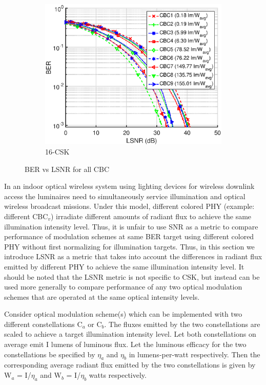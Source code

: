 \documentclass[10pt,letterpaper]{article}
\begin{document}
\begin{figure}[b]
		\vfill
		\begin{subfigure}{0.49\textwidth}
		\centering
			\includegraphics[trim={0.1in 0.0in 0.5in 0.1in}, clip=true, width=\textwidth]{M16_16-CSK_BERvsLSNR_NL.eps}
			\caption{16-CSK}
			\label{fig16LSNR}
		\end{subfigure}
	\caption{BER vs LSNR for all CBC}
	\label{figBERvsLSNR}
\end{figure}

In an indoor optical wireless system using lighting devices for wireless downlink access the luminaires need to simultaneously service illumination and optical wireless broadcast missions. Under this model, different colored PHY (example: different CBC$_{v}$) irradiate different amounts of radiant flux to achieve the same illumination intensity level. Thus, it is unfair to use SNR as a metric to compare performance of modulation schemes at same BER target using different colored PHY without first normalizing for illumination targets. Thus, in this section we introduce LSNR as a metric that takes into account the differences in radiant flux emitted by different PHY to achieve the same illumination intensity level. {\color{red}It should be noted that the LSNR metric is not specific to CSK, but instead can be used more generally to compare performance of any two optical modulation schemes that are operated at the same optical intensity levels.}

Consider optical modulation scheme(s) which can be implemented with two different constellations C$_a$ or C$_b$. The fluxes emitted by the two constellations are scaled to achieve a target illumination intensity level. Let both constellations on average emit I lumens of luminous flux. Let the luminous efficacy for the two constellations be specified by $\eta_a$ and $\eta_b$ in lumens-per-watt respectively. Then the corresponding average radiant flux emitted by the two constellations is given by W$_a$ = I/$\eta_a$ and W$_b$  = I/$\eta_b$ watts respectively. 
\end{document}
